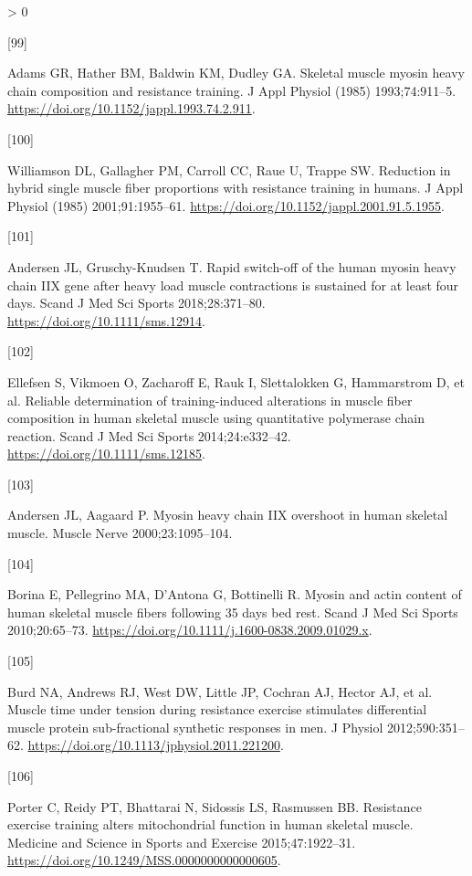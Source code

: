 \documentclass[twoside,10pt]{gihclass} %
\newlength{\cslhangindent}
\newlength{\csllabelwidth}
\newenvironment{CSLReferences}[3] %
 {%
  \setlength{\parindent}{0pt}
  \ifodd #1 \everypar{\setlength{\hangindent}{\cslhangindent}}\ignorespaces\fi
  \ifnum #2 > 0
  \setlength{\parskip}{#2\baselineskip}
  \fi
 }%
 {}
\newcommand{\CSLLeftMargin}[1]{\parbox[t]{\maxof{\widthof{#1}}{\csllabelwidth}}{#1}}
\newcommand{\CSLRightInline}[1]{\parbox[t]{\linewidth}{#1}}
\begin{document}
\begin{CSLReferences}{0}{0}
\leavevmode\hypertarget{ref-RN2220}{}%
\CSLLeftMargin{{[}99{]} }
\CSLRightInline{Adams GR, Hather BM, Baldwin KM, Dudley GA. Skeletal muscle myosin heavy chain composition and resistance training. J Appl Physiol (1985) 1993;74:911--5. \url{https://doi.org/10.1152/jappl.1993.74.2.911}.}

\leavevmode\hypertarget{ref-RN2799}{}%
\CSLLeftMargin{{[}100{]} }
\CSLRightInline{Williamson DL, Gallagher PM, Carroll CC, Raue U, Trappe SW. Reduction in hybrid single muscle fiber proportions with resistance training in humans. J Appl Physiol (1985) 2001;91:1955--61. \url{https://doi.org/10.1152/jappl.2001.91.5.1955}.}

\leavevmode\hypertarget{ref-RN2056}{}%
\CSLLeftMargin{{[}101{]} }
\CSLRightInline{Andersen JL, Gruschy-Knudsen T. Rapid switch-off of the human myosin heavy chain IIX gene after heavy load muscle contractions is sustained for at least four days. Scand J Med Sci Sports 2018;28:371--80. \url{https://doi.org/10.1111/sms.12914}.}

\leavevmode\hypertarget{ref-RN1489}{}%
\CSLLeftMargin{{[}102{]} }
\CSLRightInline{Ellefsen S, Vikmoen O, Zacharoff E, Rauk I, Slettalokken G, Hammarstrom D, et al. Reliable determination of training-induced alterations in muscle fiber composition in human skeletal muscle using quantitative polymerase chain reaction. Scand J Med Sci Sports 2014;24:e332--42. \url{https://doi.org/10.1111/sms.12185}.}

\leavevmode\hypertarget{ref-RN2057}{}%
\CSLLeftMargin{{[}103{]} }
\CSLRightInline{Andersen JL, Aagaard P. Myosin heavy chain IIX overshoot in human skeletal muscle. Muscle Nerve 2000;23:1095--104.}

\leavevmode\hypertarget{ref-RN2108}{}%
\CSLLeftMargin{{[}104{]} }
\CSLRightInline{Borina E, Pellegrino MA, D'Antona G, Bottinelli R. Myosin and actin content of human skeletal muscle fibers following 35 days bed rest. Scand J Med Sci Sports 2010;20:65--73. \url{https://doi.org/10.1111/j.1600-0838.2009.01029.x}.}

\leavevmode\hypertarget{ref-RN1505}{}%
\CSLLeftMargin{{[}105{]} }
\CSLRightInline{Burd NA, Andrews RJ, West DW, Little JP, Cochran AJ, Hector AJ, et al. Muscle time under tension during resistance exercise stimulates differential muscle protein sub-fractional synthetic responses in men. J Physiol 2012;590:351--62. \url{https://doi.org/10.1113/jphysiol.2011.221200}.}

\leavevmode\hypertarget{ref-RN2608}{}%
\CSLLeftMargin{{[}106{]} }
\CSLRightInline{Porter C, Reidy PT, Bhattarai N, Sidossis LS, Rasmussen BB. Resistance exercise training alters mitochondrial function in human skeletal muscle. Medicine and Science in Sports and Exercise 2015;47:1922--31. \url{https://doi.org/10.1249/MSS.0000000000000605}.}


\end{CSLReferences}
\end{document}
